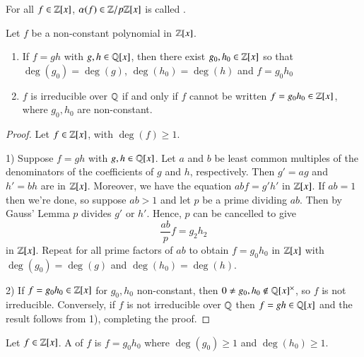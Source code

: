 \documentclass[12pt, a4paper, oneside, openright, titlepage]{book}
\begin{document}
\begin{defn}
    For all $f \in \mathbb Z[x]$, $\alpha(f) \in \mathbb Z/p\mathbb Z[x]$ is called .
\end{defn}

\begin{cor}
    Let $f$ be a non-constant polynomial in $\mathbb Z[x]$. \begin{enumerate}
        \item If $f =gh$ with $g,h \in \mathbb Q[x]$, then there exist $g_0,h_0 \in \mathbb Z[x]$ so that $\deg(g_0) = \deg(g)$, $\deg(h_0) = \deg(h)$ and $f = g_0h_0$
        \item $f$ is irreducible over $\mathbb Q$ if and only if $f$ cannot be written $f = g_0h_0 \in \mathbb Z[x]$, where $g_0,h_0$ are non-constant.
    \end{enumerate}
\end{cor}
\begin{proof}
    Let $f \in \mathbb Z[x]$, with $\deg(f) \geq 1$. 
    
    1) Suppose $f = gh$ with $g,h \in \mathbb Q[x]$. Let $a$ and $b$ be least common multiples of the denominators of the coefficients of $g$ and $h$, respectively. Then $g' = ag$ and $h' = bh$ are in $\mathbb Z[x]$. Moreover, we have the equation $abf = g'h'$ in $\mathbb Z[x]$. If $ab = 1$ then we're done, so suppose $ab > 1$ and let $p$ be a prime dividing $ab$. Then by Gauss' Lemma $p$ divides $g'$ or $h'$. Hence, $p$ can be cancelled to give \begin{equation}
        \frac{ab}{p}f = g_2h_2
    \end{equation}
    in $\mathbb Z[x]$. Repeat for all prime factors of $ab$ to obtain $f = g_0h_0$ in $\mathbb Z[x]$ with $\deg(g_0) = \deg(g)$ and $\deg(h_0) = \deg(h)$.
    
    2) If $f = g_0h_0 \in \mathbb Z[x]$ for $g_0,h_0$ non-constant, then $0 \neq g_0,h_0 \notin \mathbb Q[x]^{\times}$, so $f$ is not irreducible. Conversely, if $f$ is not irreducible over $\mathbb Q$ then $f = gh \in \mathbb Q[x]$ and the result follows from 1), completing the proof.
\end{proof}

\begin{defn}
    Let $f \in \mathbb Z[x]$. A  of $f$ is $f = g_0h_0$ where $\deg(g_0) \geq 1$ and $\deg(h_0) \geq 1$.
\end{defn}
\end{document}
